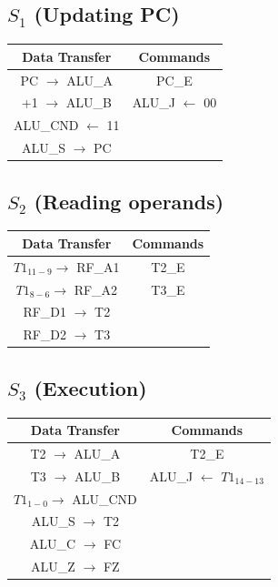 \documentclass[]{report}
\begin{document}
        \subsection*{$S_1$ (Updating PC)}   %
        \begin{center}
            \begin{tabular}{|c|c|}
                \hline
                Data Transfer & Commands \\
                \hline
                PC $\to$ ALU\_A & PC\_E\\
                +1 $\to$ ALU\_B & ALU\_J $\leftarrow$ 00\\
                ALU\_CND $\leftarrow$ 11 & \\
                ALU\_S $\to$ PC &\\
                \hline
            \end{tabular}
        \end{center}
        \subsection*{$S_2$ (Reading operands)}
        \begin{center}
            \begin{tabular}{|c|c|}
                \hline
                Data Transfer & Commands \\
                \hline
                $T1_{11-9} \to$ RF\_A1  & T2\_E\\
                $T1_{8-6} \to$ RF\_A2 & T3\_E\\
                RF\_D1 $\to$ T2 & \\
                RF\_D2 $\to$ T3 & \\
                \hline
            \end{tabular}
        \end{center}
        \subsection*{$S_3$ (Execution)} %
        \begin{center}
            \begin{tabular}{|c|c|}
                \hline
                Data Transfer & Commands \\
                \hline
                T2 $\to$ ALU\_A & T2\_E\\
                T3 $\to$ ALU\_B & ALU\_J $\leftarrow$ $T1_{14-13}$\\
                $T1_{1-0} \to $ ALU\_CND & \\
                ALU\_S $\to$ T2 & \\
                ALU\_C $\to$ FC & \\
                ALU\_Z $\to$ FZ & \\
                \hline
            \end{tabular}
        \end{center}
\end{document}
